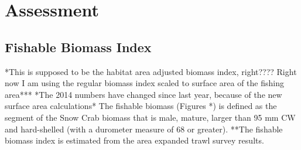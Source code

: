 \documentclass[paper=a4, fontsize=11pt]{article}
\begin{document}



\section{Assessment}

\subsection{Fishable Biomass Index}
*This is supposed to be the habitat area adjusted biomass index, right???? Right now I am using the regular biomass index scaled to surface area of the fishing area***
*The 2014 numbers have changed since last year, because of the new surface area calculations* The fishable biomass (Figures *) is defined as the segment of the Snow Crab biomass that is male, mature, larger than 95 mm CW and hard-shelled (with a durometer measure of 68 or greater). **The fishable biomass index is estimated from the area expanded trawl survey results.\\
\end{document}
